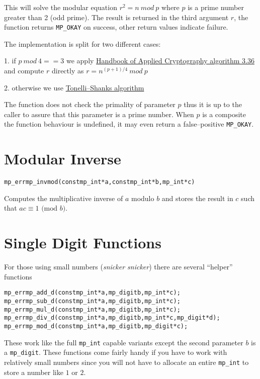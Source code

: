\documentclass[synpaper]{book}
\def\mod{{\mathit\ mod\ }}
\begin{document}
This will solve the modular equation $r^2 = n \mod p$ where $p$ is a prime number greater than 2
(odd prime). The result is returned in the third argument $r$, the function returns
\texttt{MP\_OKAY} on success, other return values indicate failure.

The implementation is split for two different cases:

1. if $p \mod 4 == 3$ we apply \href{http://cacr.uwaterloo.ca/hac/}{Handbook of Applied
  Cryptography algorithm 3.36} and compute $r$ directly as $r = n^{(p+1)/4} \mod p$

2. otherwise we use \href{https://en.wikipedia.org/wiki/Tonelli-Shanks_algorithm}{Tonelli--Shanks
  algorithm}

The function does not check the primality of parameter $p$ thus it is up to the caller to assure
that this parameter is a prime number. When $p$ is a composite the function behaviour is undefined,
it may even return a false--positive \texttt{MP\_OKAY}.

\section{Modular Inverse}
\begin{alltt}
mp_err mp_invmod (const mp_int *a, const mp_int *b, mp_int *c)
\end{alltt}
Computes the multiplicative inverse of $a$ modulo $b$ and stores the result in $c$ such that
$ac \equiv 1 \mbox{ (mod }b\mbox{)}$.

\section{Single Digit Functions}

For those using small numbers (\textit{snicker snicker}) there are several ``helper'' functions

    
\begin{alltt}
mp_err mp_add_d(const mp_int *a, mp_digit b, mp_int *c);
mp_err mp_sub_d(const mp_int *a, mp_digit b, mp_int *c);
mp_err mp_mul_d(const mp_int *a, mp_digit b, mp_int *c);
mp_err mp_div_d(const mp_int *a, mp_digit b, mp_int *c, mp_digit *d);
mp_err mp_mod_d(const mp_int *a, mp_digit b, mp_digit *c);
\end{alltt}

These work like the full \texttt{mp\_int} capable variants except the second parameter $b$ is a
\texttt{mp\_digit}.  These functions come fairly handy if you have to work with relatively small numbers
since you will not have to allocate an entire \texttt{mp\_int} to store a number like $1$ or $2$.
\end{document}
